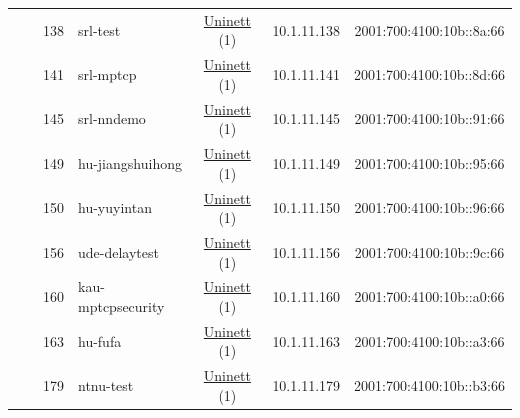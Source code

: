 \begin{small}
\begin{center}
\begin{longtable}{|c|c|c|c|c|c|c|c|}
  &  & \tiny{138} & \multicolumn{1}{|l|}{\tiny{srl-test}} & \multicolumn{2}{|c|}{\tiny{\href{https://www.uninett.no}{Uninett} (1)}} & \tiny{10.1.11.138} & \tiny{2001:700:4100:10b::8a:66} \\* \cline{3-3}\cline{4-4}\cline{5-5}\cline{6-6}\cline{7-7}\cline{8-8}
  &  & \tiny{141} & \multicolumn{1}{|l|}{\tiny{srl-mptcp}} & \multicolumn{2}{|c|}{\tiny{\href{https://www.uninett.no}{Uninett} (1)}} & \tiny{10.1.11.141} & \tiny{2001:700:4100:10b::8d:66} \\* \cline{3-3}\cline{4-4}\cline{5-5}\cline{6-6}\cline{7-7}\cline{8-8}
  &  & \tiny{145} & \multicolumn{1}{|l|}{\tiny{srl-nndemo}} & \multicolumn{2}{|c|}{\tiny{\href{https://www.uninett.no}{Uninett} (1)}} & \tiny{10.1.11.145} & \tiny{2001:700:4100:10b::91:66} \\* \cline{3-3}\cline{4-4}\cline{5-5}\cline{6-6}\cline{7-7}\cline{8-8}
  &  & \tiny{149} & \multicolumn{1}{|l|}{\tiny{hu-jiangshuihong}} & \multicolumn{2}{|c|}{\tiny{\href{https://www.uninett.no}{Uninett} (1)}} & \tiny{10.1.11.149} & \tiny{2001:700:4100:10b::95:66} \\* \cline{3-3}\cline{4-4}\cline{5-5}\cline{6-6}\cline{7-7}\cline{8-8}
  &  & \tiny{150} & \multicolumn{1}{|l|}{\tiny{hu-yuyintan}} & \multicolumn{2}{|c|}{\tiny{\href{https://www.uninett.no}{Uninett} (1)}} & \tiny{10.1.11.150} & \tiny{2001:700:4100:10b::96:66} \\* \cline{3-3}\cline{4-4}\cline{5-5}\cline{6-6}\cline{7-7}\cline{8-8}
  &  & \tiny{156} & \multicolumn{1}{|l|}{\tiny{ude-delaytest}} & \multicolumn{2}{|c|}{\tiny{\href{https://www.uninett.no}{Uninett} (1)}} & \tiny{10.1.11.156} & \tiny{2001:700:4100:10b::9c:66} \\* \cline{3-3}\cline{4-4}\cline{5-5}\cline{6-6}\cline{7-7}\cline{8-8}
  &  & \tiny{160} & \multicolumn{1}{|l|}{\tiny{kau-mptcpsecurity}} & \multicolumn{2}{|c|}{\tiny{\href{https://www.uninett.no}{Uninett} (1)}} & \tiny{10.1.11.160} & \tiny{2001:700:4100:10b::a0:66} \\* \cline{3-3}\cline{4-4}\cline{5-5}\cline{6-6}\cline{7-7}\cline{8-8}
  &  & \tiny{163} & \multicolumn{1}{|l|}{\tiny{hu-fufa}} & \multicolumn{2}{|c|}{\tiny{\href{https://www.uninett.no}{Uninett} (1)}} & \tiny{10.1.11.163} & \tiny{2001:700:4100:10b::a3:66} \\* \cline{3-3}\cline{4-4}\cline{5-5}\cline{6-6}\cline{7-7}\cline{8-8}
  &  & \tiny{179} & \multicolumn{1}{|l|}{\tiny{ntnu-test}} & \multicolumn{2}{|c|}{\tiny{\href{https://www.uninett.no}{Uninett} (1)}} & \tiny{10.1.11.179} & \tiny{2001:700:4100:10b::b3:66} \\* \cline{3-3}\cline{4-4}\cline{5-5}\cline{6-6}\cline{7-7}\cline{8-8}

\end{longtable}
\end{center}
\end{small}
